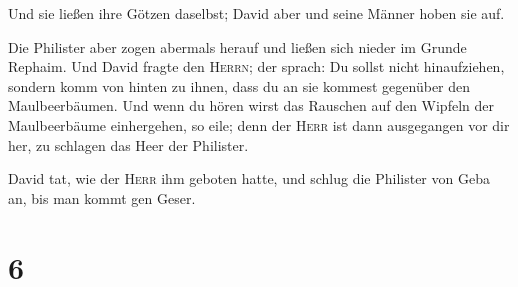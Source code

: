  Und sie ließen ihre Götzen daselbst; David aber und
seine Männer hoben sie auf.

 Die Philister aber zogen abermals herauf und ließen sich
nieder im Grunde Rephaim.  Und David fragte den
\textsc{Herrn}; der sprach: Du sollst nicht hinaufziehen, sondern komm
von hinten zu ihnen, dass du an sie kommest gegenüber den
Maulbeerbäumen.  Und wenn du hören wirst das Rauschen auf
den Wipfeln der Maulbeerbäume einhergehen, so eile; denn der
\textsc{Herr} ist dann ausgegangen vor dir her, zu schlagen das Heer der
Philister.

 David tat, wie der \textsc{Herr} ihm geboten hatte, und
schlug die Philister von Geba an, bis man kommt gen Geser.

\hypertarget{section-5}{%
\section{6}\label{section-5}}

